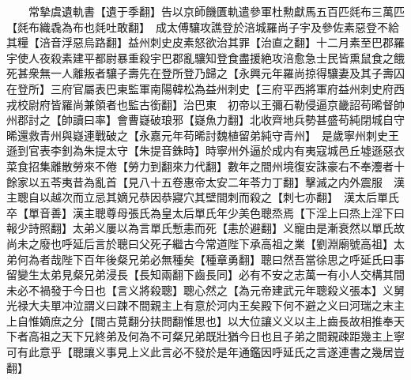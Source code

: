 　　常摯虞遺軌書【遺于季翻】告以京師饑匱軌遣參軍杜勲獻馬五百匹㲜布三萬匹【㲜布織毳為布也㲜吐敢翻】　成太傅驤攻譙登於涪城羅尚子宇及參佐素惡登不給其糧【涪音浮惡烏路翻】益州刺史皮素怒欲治其罪【治直之翻】十二月素至巴郡羅宇使人夜殺素建平都尉暴重殺宇巴郡亂驤知登食盡援絶攻涪愈急士民皆熏鼠食之餓死甚衆無一人離叛者驤子壽先在登所登乃歸之【永興元年羅尚掠得驤妻及其子壽囚在登所】三府官屬表巴東監軍南陽韓松為益州刺史【三府平西將軍府益州刺史府西戎校尉府皆羅尚兼領者也監古銜翻】治巴東　初帝以王彌石勒侵逼京畿詔苟晞督帥州郡討之【帥讀曰率】會曹嶷破琅邪【嶷魚力翻】北收齊地兵勢甚盛苟純閉城自守晞還救青州與嶷連戰破之【永嘉元年苟晞討魏植留弟純守青州】　是歲寧州刺史王遜到官表李釗為朱提太守【朱提音銖時】時寧州外逼於成内有夷寇城邑丘墟遜惡衣菜食招集離散勞來不倦【勞力到翻來力代翻】數年之間州境復安誅豪右不奉灋者十餘家以五苓夷昔為亂首【見八十五卷惠帝太安二年苓力丁翻】擊滅之内外震服　漢主聰自以越次而立忌其嫡兄恭因恭寢穴其壁間刺而殺之【刺七亦翻】　漢太后單氏卒【單音善】漢主聰尊母張氏為皇太后單氏年少美色聰烝焉【下淫上曰烝上淫下曰報少詩照翻】太弟义屢以為言單氏慙恚而死【恚於避翻】义寵由是漸衰然以單氏故尚未之廢也呼延后言於聰曰父死子繼古今常道陛下承高祖之業【劉淵廟號高祖】太弟何為者哉陛下百年後粲兄弟必無種矣【種章勇翻】聰曰然吾當徐思之呼延氏曰事留變生太弟見粲兄弟浸長【長知兩翻下齒長同】必有不安之志萬一有小人交構其間未必不禍發于今日也【言义將殺聰】聰心然之【為元帝建武元年聰殺义張本】义舅光禄大夫單冲泣謂义曰踈不間親主上有意於河内王矣殿下何不避之义曰河瑞之末主上自惟嫡庶之分【間古莧翻分扶問翻惟思也】以大位讓义义以主上齒長故相推奉天下者高祖之天下兄終弟及何為不可粲兄弟既壯猶今日也且子弟之間親疎距幾主上寧可有此意乎【聰讓义事見上义此言必不發於是年通鑑因呼延氏之言遂連書之幾居豈翻】

